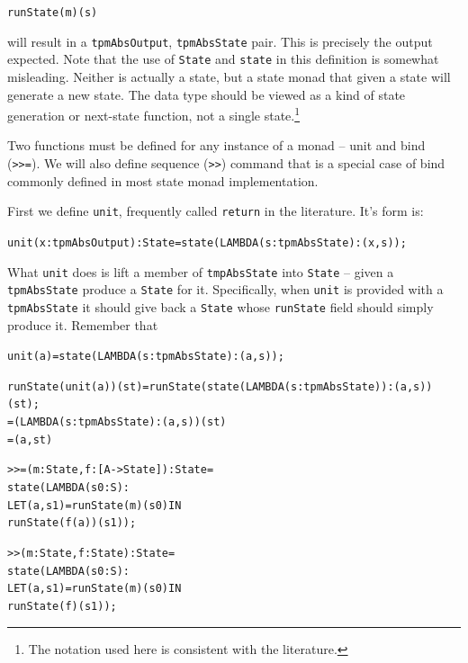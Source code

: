 \documentclass[10pt]{article}
\begin{document}
\begin{alltt}
  runState(m)(s)
\end{alltt}

\noindent will result in a \verb!tpmAbsOutput!, \verb!tpmAbsState!
pair.  This is precisely the output expected.  Note that the use of
\verb!State! and \verb!state! in this definition is somewhat
misleading.  Neither is actually a state, but a state monad that given
a state will generate a new state.  The data type should be viewed as
a kind of state generation or next-state function, not a single
state.\footnote{The notation used here is consistent with the
  literature.}

Two functions must be defined for any instance of a monad -- unit and
bind (\verb!>>=!).  We will also define sequence (\verb!>>!) command
that is a special case of bind commonly defined in most state monad
implementation.

First we define \verb!unit!, frequently called \verb!return! in the
literature.  It's form is:

\begin{alltt}
  unit(x:tpmAbsOutput):State = state(LAMBDA (s:tpmAbsState) : (x,s));
\end{alltt}

What \verb!unit! does is lift a member of \verb!tmpAbsState! into
\verb!State! -- given a \verb!tpmAbsState! produce a \verb!State! for
it.  Specifically, when \verb!unit! is provided with a
\verb!tpmAbsState! it should give back a \verb!State! whose
\verb!runState! field should simply produce it.  Remember that

\begin{alltt}
  unit(a) = state(LAMBDA (s:tpmAbsState) : (a,s));
\end{alltt}

\begin{alltt}
  runState(unit(a))(st) = runState(state(LAMBDA (s:tpmAbsState)) :  (a,s))(st);
                        = (LAMBDA (s:tpmAbsState) : (a,s))(st)
                        = (a,st)
\end{alltt}

\begin{alltt}
 >>= (m:State,f:[A->State]):State =
   state(LAMBDA(s0:S):
          LET (a,s1) = runState(m)(s0) IN 
	    runState(f(a))(s1));

 >> (m:State,f:State):State =
   state(LAMBDA(s0:S):
          LET (a,s1) = runState(m)(s0) IN
            runState(f)(s1));
\end{alltt}
\end{document}

